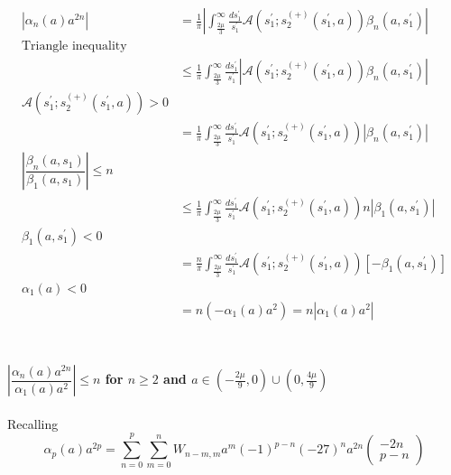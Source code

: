 ﻿\documentclass[12pt,a4paper]{article}
\begin{document}
$$
\begin{aligned}
\left|\alpha_{n}(a) a^{2 n}\right|&=\frac{1}{\pi}\left|\int_{\frac{2 \mu}{3}}^{\infty} \frac{d s_{1}^{\prime}}{s_{1}^{\prime}} \mathcal{A}\left(s_{1}^{\prime} ; s_{2}^{(+)}\left(s_{1}^{\prime}, a\right)\right) \beta_{n}\left(a, s_{1}^{\prime}\right)\right|\\
\text{Triangle inequality}\\
&\leq \frac{1}{\pi} \int_{\frac{2 \mu}{3}}^{\infty} \frac{d s_{1}^{\prime}}{s_{1}^{\prime}}\left|\mathcal{A}\left(s_{1}^{\prime} ; s_{2}^{(+)}\left(s_{1}^{\prime}, a\right)\right) \beta_{n}\left(a, s_{1}^{\prime}\right)\right|\\
\text{$\mathcal{A}\left(s_{1}^{\prime} ; s_{2}^{(+)}\left(s_{1}^{\prime}, a\right)\right)>0$}\\
&=\frac{1}{\pi} \int_{\frac{2 \mu}{3}}^{\infty} \frac{d s_{1}^{\prime}}{s_{1}^{\prime}} \mathcal{A}\left(s_{1}^{\prime} ; s_{2}^{(+)}\left(s_{1}^{\prime}, a\right)\right)\left|\beta_{n}\left(a, s_{1}^{\prime}\right)\right|\\
\text{$\left|\dfrac{\beta_{n}\left(a, s_{1}\right)}{\beta_{1}\left(a, s_{1}\right)}\right| \leq n$}\\
&\leq \frac{1}{\pi} \int_{\frac{2 \mu}{3}}^{\infty} \frac{d s_{1}^{\prime}}{s_{1}^{\prime}} \mathcal{A}\left(s_{1}^{\prime} ; s_{2}^{(+)}\left(s_{1}^{\prime}, a\right)\right) n\left|\beta_{1}\left(a, s_{1}^{\prime}\right)\right|\\
\text{$\beta_{1}\left(a, s_{1}^{\prime}\right)< 0$}\\
&=\frac{n}{\pi} \int_{\frac{2 \mu}{3}}^{\infty} \frac{d s_{1}^{\prime}}{s_{1}^{\prime}}  \mathcal{A}\left(s_{1}^{\prime} ; s_{2}^{(+)}\left(s_{1}^{\prime}, a\right)\right)\left[-\beta_{1}\left(a, s_{1}^{\prime}\right)\right] \\
\text{$\alpha_{1}(a)<0$}\\
&=n\left(-\alpha_{1}(a) a^{2}\right)=n\left|\alpha_{1}(a) a^{2}\right|\\
\end{aligned}
$$
\\\\
\textbf{$\left|\dfrac{\alpha_{n}(a) a^{2 n}}{\alpha_{1}(a) a^{2}}\right| \leq n$ for $n\geq 2$ and $a \in\left(-\frac{2 \mu}{9}, 0\right) \cup\left(0, \frac{4 \mu}{9}\right)$}\\\\
Recalling 
$$
\alpha_{p}(a) a^{2 p}=\sum_{n=0}^{p} \sum_{m=0}^{n} W_{n-m, m} a^{m}(-1)^{p-n}(-27)^{n} a^{2 n}\left(\begin{array}{c}
-2 n \\
p-n
\end{array}\right)
$$
\end{document}
